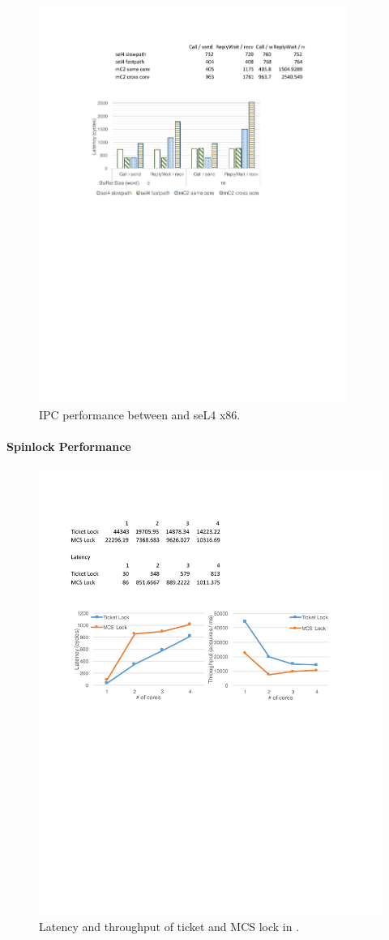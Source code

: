 \begin{figure}\centering
		\includegraphics[width=10cm]{figs/ipc.pdf}
		\caption{IPC performance between \cCTOS{} and  seL4 x86.}
		\label{fig:eval_ipc}
		\hrulefill
\end{figure}


\paragraph{Spinlock Performance}
\begin{figure}\centering
		\includegraphics[width=12cm]{figs/locks.pdf}
		\caption{Latency and throughput of ticket and MCS lock in \cCTOS{}.}
		\label{fig:eval_spin}
\end{figure}


